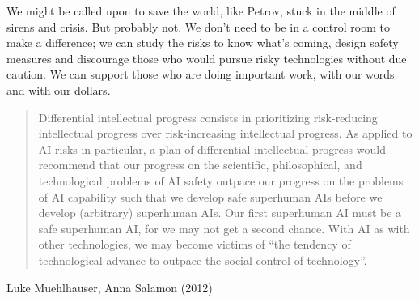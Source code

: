 \documentclass{article}
\begin{document}
We might be called upon to save the world, like Petrov, stuck in the middle of
sirens and crisis. But probably not. We don't need to be in a control room to
make a difference; we can study the risks to know what's coming, design safety
measures and discourage those who would pursue risky technologies without due
caution. We can support those who are doing important work, with our words and
with our dollars.

\divider

\blockquote{Differential intellectual progress consists in prioritizing risk-reducing
intellectual progress over risk-increasing intellectual progress. As applied to
AI risks in particular, a plan of differential intellectual progress would
recommend that our progress on the scientific, philosophical, and technological
problems of AI safety outpace our progress on the problems of AI capability
such that we develop safe superhuman AIs before we develop (arbitrary)
superhuman AIs. Our first superhuman AI must be a safe superhuman AI, for we
may not get a second chance. With AI as with other technologies, we may become
victims of ``the tendency of technological advance to outpace the social control
of technology''.}{Luke Muehlhauser, Anna Salamon (2012)}

\end{document}
